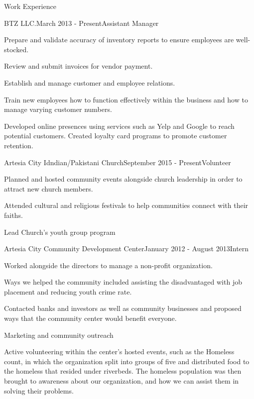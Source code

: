 \documentclass{resume} %
\begin{document}

\begin{rSection}{Work Experience}

\begin{rSubsection}{BTZ LLC.}{March 2013 - Present}{Assistant Manager}{}
\item Prepare and validate accuracy of inventory reports to ensure employees are well-stocked.
\item Review and submit invoices for vendor payment.
\item Establish and manage customer and employee relations.
\item Train new employees how to function effectively within the business and how to manage varying customer numbers.
\item Developed online presences using services such as Yelp and Google to reach potential customers. Created loyalty card programs to promote customer retention.
\end{rSubsection}

\begin{rSubsection}{Artesia City Idndian/Pakistani Church}{September 2015 - Present}{Volunteer}{}
\item Planned and hosted community events alongside church leadership in order to attract new church members.
\item Attended cultural and religious festivals to help communities connect with their faiths.
\item Lead Church’s youth group program
\end{rSubsection}

\begin{rSubsection}{Artesia City Community Development Center}{January 2012 - August 2013}{Intern}{}
\item Worked alongside the directors to manage a non-profit organization.
\item Ways we helped the community included assisting the disadvantaged with job placement and reducing youth crime rate.
\item Contacted banks and investors as well as community businesses and proposed ways that the community center would benefit everyone.
\item Marketing and community outreach
\item Active volunteering within the center’s hosted events, such as the Homeless count, in which the organization split into groups of five and distributed food to the homeless that resided under riverbeds. The homeless population was then brought to awareness about our organization, and how we can assist them in solving their problems.
\end{rSubsection}



\end{rSection}
\end{document}
